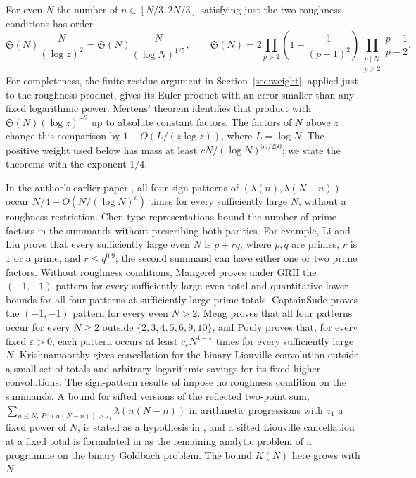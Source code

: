 \documentclass[11pt]{article}
\theoremstyle{definition}
\theoremstyle{remark}
\begin{document}
For even $N$ the number of $n\in[N/3,2N/3]$ satisfying just the two
roughness conditions has order
\begin{equation}\label{eq:rough-scale}
\mathfrak S(N)\frac{N}{(\log z)^2}
=\mathfrak S(N)\frac{N}{(\log N)^{1/5}},
\qquad
\mathfrak S(N)=2\prod_{p>2}\left(1-\frac1{(p-1)^2}\right)
                 \prod_{\substack{p\mid N\\p>2}}\frac{p-1}{p-2}.
\end{equation}
For completeness, the finite-residue argument in
Section~\ref{sec:weight}, applied just to the roughness product, gives its
Euler product with an error smaller than any fixed logarithmic power.
Mertens' theorem \cite[Section~2.2]{MV} identifies that product with
$\mathfrak S(N)(\log z)^{-2}$ up to absolute constant factors.
The factors of $N$ above $z$ change this comparison by
$1+O(L/(z\log z))$, where $L=\log N$.
The positive weight used below has mass at least
$cN/(\log N)^{59/250}$; we state the theorems with the exponent $1/4$.

In the author's earlier paper \cite{GuoEarlier}, all four sign patterns
of $(\lambda(n),\lambda(N-n))$ occur
$N/4+O(N/(\log N)^c)$ times for every sufficiently large $N$,
without a roughness restriction. Chen-type representations bound the
number of prime factors in the summands without prescribing both
parities. For example, Li and Liu \cite{LiLiu} prove that every sufficiently
large even $N$ is $p+rq$, where $p,q$ are primes, $r$ is $1$ or a prime,
and $r\le q^{0.9}$; the second summand can have either one or two
prime factors. Without roughness conditions, Mangerel
\cite{MangerelGRH} proves under GRH the $(-1,-1)$ pattern for every
sufficiently large even total and quantitative lower bounds for all
four patterns at sufficiently large prime totals.
CaptainSude \cite{CaptainSude} proves the $(-1,-1)$ pattern for every
even $N>2$. Meng \cite[Theorem~A]{Meng2026} proves that all four
patterns occur for every $N\ge2$ outside $\{2,3,4,5,6,9,10\}$, and
Pouly \cite[Theorem~1.1]{Pouly2026} proves that, for every fixed
$\varepsilon>0$, each pattern occurs at least
$c_\varepsilon N^{1-\varepsilon}$ times for every sufficiently large $N$.
Krishnamoorthy \cite{Krishnamoorthy2026} gives cancellation
for the binary Liouville convolution outside a small set of totals
and arbitrary logarithmic savings for its fixed higher convolutions.
The sign-pattern results of
\cite{MangerelGRH,CaptainSude,Meng2026,Pouly2026,Krishnamoorthy2026} impose no roughness
condition on the summands. A bound for sifted versions of the reflected two-point sum,
$\sum_{n\le N,\ P^-(n(N-n))>z_1}\lambda(n(N-n))$ in arithmetic progressions with $z_1$ a fixed power
of $N$, is stated as a hypothesis in \cite[Hypothesis~3.3]{Deligiannis2026}, and a sifted Liouville
cancellation at a fixed total is formulated in \cite{Arneth2026} as the remaining analytic problem of a
programme on the binary Goldbach problem. The bound $K(N)$ here grows with $N$.
\end{document}
